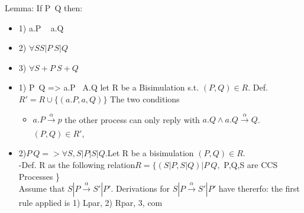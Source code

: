 \documentclass[a4paper,10pt,titlepage]{report}
\begin{document}
\hspace{5mm}	Lemma: If P~Q then: \\
\begin{itemize}
\item	1) a.P ~ a.Q
\item	2) $\forall S S|P ~S|Q$
\item	3) $\forall S+P ~ S+Q$
\end{itemize}

\begin{itemize}
\item 1) P~Q => a.P ~A.Q let R be a Bisimulation s.t. $(P,Q) \in R$. Def. $R' = R \cup \{ (a.P, a,Q) \}$
	The two conditions
	\begin{itemize}
	\item $a.P \xrightarrow[\text{}]{{ {\alpha} }} p$ the other process can only reply with $a.Q \wedge a.Q\xrightarrow[\text{}]{{ {\alpha} }} Q$. $(P,Q) \in R'$, 
	\end{itemize}
\item 2)$P~Q => \forall S, S|P | S|Q. $Let R be a bisimulation $(P,Q) \in R. $ \\
	-Def. R as the following relation$ R = \{ (S|P,S|Q) | P~Q,$ P,Q,S are CCS Processes \} \\
		Assume that $S|P \xrightarrow[\text{}]{{ {\alpha} }} S'|P'$. Derivations for $S|P \xrightarrow[\text{}]{{ {\alpha} }} S'|P'$ have thererfo: the first rule applied is 1) Lpar, 2) Rpar, 3, com
\end{itemize}	
\end{document}
